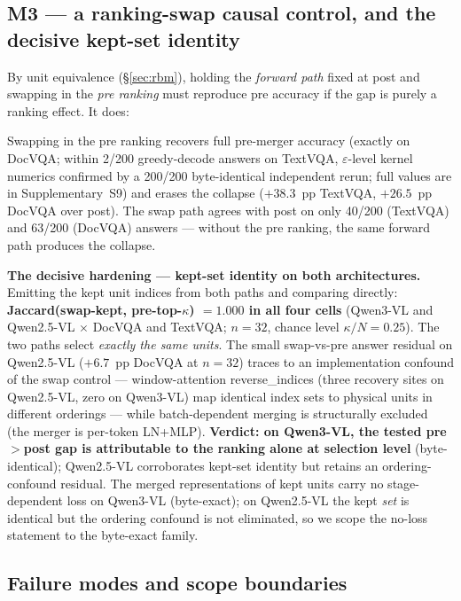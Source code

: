 \documentclass[journal]{IEEEtran}
\begin{document}
\subsection{M3 --- a ranking-swap causal control, and the decisive kept-set identity}\label{sec:m3}

By unit equivalence (\S\ref{sec:rbm}), holding the \emph{forward path} fixed at
post and swapping in the \emph{pre ranking} must reproduce pre accuracy if the
gap is purely a ranking effect. It does:

Swapping in the pre ranking recovers full pre-merger accuracy (exactly on
DocVQA; within 2/200 greedy-decode answers on TextVQA, $\varepsilon$-level
kernel numerics confirmed by a 200/200 byte-identical independent rerun; full
values are in Supplementary~S9) and
erases the collapse ($+38.3$~pp TextVQA, $+26.5$~pp DocVQA over post). The swap
path agrees with post on only 40/200 (TextVQA) and 63/200 (DocVQA) answers ---
without the pre ranking, the same forward path produces the collapse.

\textbf{The decisive hardening --- kept-set identity on both architectures.}
Emitting the kept unit indices from both paths and comparing directly:
\textbf{Jaccard(swap-kept, pre-top-$\kappa$) $= 1.000$ in all four cells}
(Qwen3-VL and Qwen2.5-VL $\times$ DocVQA and TextVQA; $n = 32$, chance level
$\kappa/N = 0.25$). The two paths select \emph{exactly the same units}. The
small swap-vs-pre answer residual on Qwen2.5-VL ($+6.7$~pp DocVQA at $n = 32$)
traces to an implementation confound of the swap control --- window-attention
reverse\_indices (three recovery sites on Qwen2.5-VL, zero on Qwen3-VL) map
identical index sets to physical units in different orderings --- while
batch-dependent merging is structurally excluded (the merger is per-token
LN+MLP). \textbf{Verdict: on Qwen3-VL, the tested pre$>$post gap is attributable
to the ranking alone at selection level} (byte-identical); Qwen2.5-VL
corroborates kept-set identity but retains an ordering-confound residual.
The merged representations of kept units carry no stage-dependent loss on
Qwen3-VL (byte-exact); on Qwen2.5-VL the kept \emph{set} is identical but the
ordering confound is not eliminated, so we scope the no-loss statement to the
byte-exact family.

\subsection{Failure modes and scope boundaries}\label{sec:modes}
\end{document}
